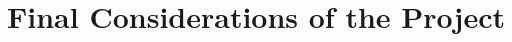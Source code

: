 \section{Final Considerations of the Project} \label{Final Considerations of the Project}
\hrulefill  %